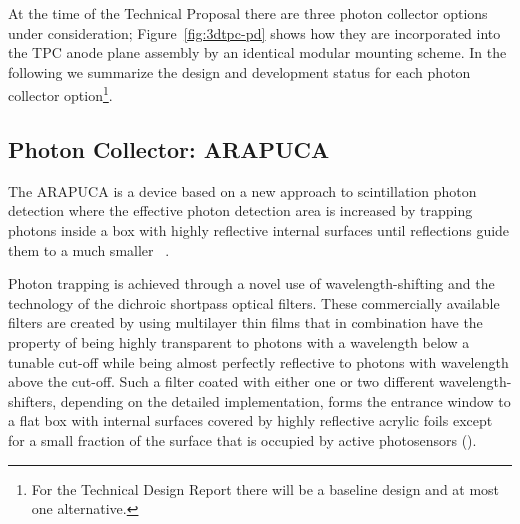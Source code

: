 
At the time of the Technical Proposal there are three photon collector options under consideration; Figure~\ref{fig:3dtpc-pd} shows how they are incorporated into the TPC anode plane assembly by an identical modular mounting scheme. In the following we summarize the design and development status for each photon collector option\footnote{For the Technical Design Report there will be a baseline design and at most one alternative.}.



\subsection{Photon Collector: ARAPUCA}
\label{ssec:fdsp-pd-pc-arapuca}

The ARAPUCA is a device based on a new approach to \lar scintillation photon detection where the effective photon detection area is increased by trapping photons inside a box with highly reflective internal surfaces until reflections guide them to a much smaller ~\cite{arapuca_jinst}. 

Photon trapping is achieved through a novel use of wavelength-shifting and the technology of the dichroic shortpass optical filters. These commercially available filters are created by using multilayer thin films that in combination have the property of being highly transparent to photons with a wavelength below a tunable cut-off while being almost perfectly reflective to photons with wavelength above the cut-off.  Such a filter coated with either one or two different wavelength-shifters, depending on the detailed implementation,  forms the entrance window to a flat box with internal surfaces covered by highly reflective acrylic foils
except for a small fraction of the surface that is occupied by active photosensors ().


